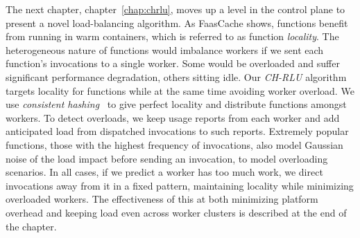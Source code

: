 The next chapter, chapter~\ref{chap:chrlu}, moves up a level in the control plane to present a novel load-balancing algorithm. %
As FaasCache shows, functions benefit from running in warm containers, which is referred to as function \emph{locality}.
The heterogeneous nature of functions would imbalance workers if we sent each function's invocations to a single worker.
Some would be overloaded and suffer significant performance degradation, others sitting idle.
Our \emph{CH-RLU} algorithm targets locality for functions while at the same time avoiding worker overload.
We use \emph{consistent hashing}~\cite{karger1997consistent} to give perfect locality and distribute functions amongst workers.
To detect overloads, we keep usage reports from each worker and add anticipated load from dispatched invocations to such reports.
Extremely popular functions, those with the highest frequency of invocations, also model Gaussian noise of the load impact before sending an invocation, to model overloading scenarios.
In all cases, if we predict a worker has too much work, we direct invocations away from it in a fixed pattern, maintaining locality while minimizing overloaded workers.
The effectiveness of this at both minimizing platform overhead and keeping load even across worker clusters is described at the end of the chapter.

